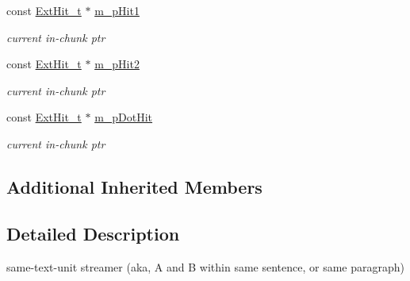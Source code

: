 \begin{DoxyCompactItemize}
const \hyperlink{structExtHit__t}{Ext\-Hit\-\_\-t} $\ast$ \hyperlink{classExtUnit__c_a72772476ca565ef692b5d9a39f9e8817}{m\-\_\-p\-Hit1}
\begin{DoxyCompactList}\small\item\em current in-\/chunk ptr \end{DoxyCompactList}\item 
const \hyperlink{structExtHit__t}{Ext\-Hit\-\_\-t} $\ast$ \hyperlink{classExtUnit__c_a6ac8ef18eab790394e8af423486d0bf4}{m\-\_\-p\-Hit2}
\begin{DoxyCompactList}\small\item\em current in-\/chunk ptr \end{DoxyCompactList}\item 
const \hyperlink{structExtHit__t}{Ext\-Hit\-\_\-t} $\ast$ \hyperlink{classExtUnit__c_a933327239d4d1cb92a214c436868c261}{m\-\_\-p\-Dot\-Hit}
\begin{DoxyCompactList}\small\item\em current in-\/chunk ptr \end{DoxyCompactList}\end{DoxyCompactItemize}
\subsection*{Additional Inherited Members}


\subsection{Detailed Description}
same-\/text-\/unit streamer (aka, A and B within same sentence, or same paragraph) 

